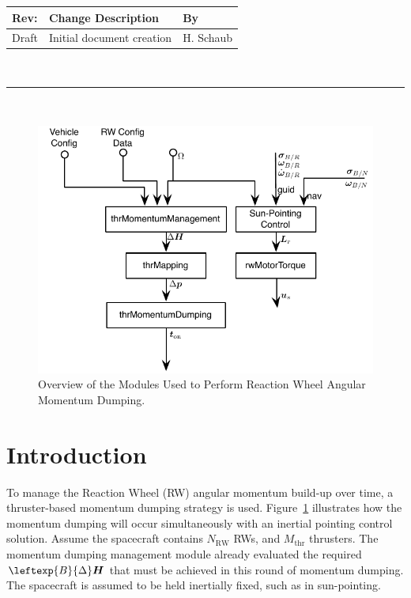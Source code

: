 \documentclass[]{BasiliskReportMemo}
\begin{document}
\makeCover


%
%
\pagestyle{empty}
{\renewcommand{\arraystretch}{1.1}
\noindent
\begin{longtable}{|p{0.5in}|p{4.5in}|p{1.14in}|}
\hline
{\bfseries Rev}: & {\bfseries Change Description} & {\bfseries By} \\
\hline
Draft & Initial document creation & H. Schaub \\
\hline

\end{longtable}
}

\newpage
\setcounter{page}{1}
\pagestyle{fancy}

\tableofcontents
~\\ \hrule ~\\

\begin{figure}[htb]
	\centerline{
	\includegraphics[]{Figures/rwMomentumOverview}
	}
	\caption{Overview of the Modules Used to Perform Reaction Wheel Angular Momentum Dumping.}
	\label{fig:Fig1}
\end{figure}

\section{Introduction}
To manage the Reaction Wheel (RW) angular momentum build-up over time, a thruster-based momentum dumping strategy is used.  Figure~\ref{fig:Fig1} illustrates how the momentum dumping will occur simultaneously with an inertial pointing control solution.  Assume the spacecraft contains $N_{\text{RW}}$ RWs, and $M_{\text{thr}}$ thrusters.   The momentum dumping management module already evaluated the required $\leftexp{B}{\Delta}\bm H$ that must be achieved in this round of momentum dumping.  The spacecraft is assumed to be held inertially fixed, such as in sun-pointing.  
\end{document}
